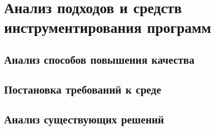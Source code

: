 \chapter{Анализ подходов и средств инструментирования программ}

\section{Анализ способов повышения качества}
\section{Постановка требований к среде}
\section{Анализ существующих решений}
